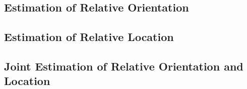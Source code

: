 \subsection{Estimation of Relative Orientation}
  \label{subsec:method_orientation_correction}
  

\subsection{Estimation of Relative Location}
  \label{subsec:method_location_correction}
  

\subsection{Joint Estimation of Relative Orientation and Location}
  \label{subsec:method_pose_correction}
  
